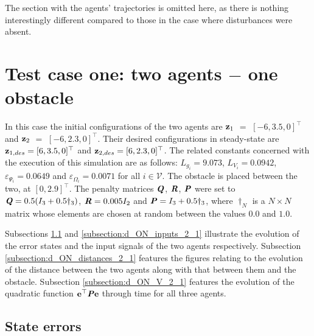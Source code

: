 The section with the agents' trajectories is omitted here, as
there is nothing interestingly different compared to those
in the case where disturbances were absent.

\section{Test case one: two agents $-$ one obstacle}

In this case the initial configurations of the two agents are
$\bm{\mathbf{z}}_1$ $=$ $[-6, 3.5, 0]^{\top}$ and
$\bm{\mathbf{z}}_2$ $=$ $[-6, 2.3, 0]^{\top}$.
Their desired configurations in steady-state are
$\bm{\mathbf{z}}_{1,des} = [6, 3.5, 0]^{\top}$ and
$\bm{\mathbf{z}}_{2,des} = [6, 2.3, 0]^{\top}$.
The related constants concerned with the execution
of this simulation are as follows: $L_{g_i} = 9.073$, $L_{V_i} = 0.0942$,
$\varepsilon_{\Psi_i} = 0.0649$ and $\varepsilon_{\Omega_i} = 0.0071$ for
all $i \in \mathcal{V}$.
The obstacle is placed between the two, at $[0, 2.9]^{\top}$. The penalty
matrices $\bm{\mathit{Q}}$, $\bm{\mathit{R}}$, $\bm{\mathit{P}}$ were set to
$\bm{\mathit{Q}} = 0.5 (I_3 + 0.5 \dagger_3)$, $\bm{\mathit{R}} = 0.005 I_2$ and
$\bm{\mathit{P}} = I_3 + 0.5 \dagger_3$, where $\dagger_N$ is a $N \times N$ matrix whose
elements are chosen at random between the values $0.0$ and $1.0$.

Subsections \ref{subsection:d_ON_errors_2_1} and \ref{subsection:d_ON_inputs_2_1}
illustrate the evolution of the error states and the input signals of the two agents
respectively. Subsection \ref{subsection:d_ON_distances_2_1} features the
figures relating to the evolution of the distance between the two agents
along with that between them and the obstacle. Subsection
\ref{subsection:d_ON_V_2_1} features the evolution of the quadratic function
$\bm{\mathbf{e}}^{\top} \bm{\mathit{P}} \bm{\mathbf{e}}$ through time for all three agents.

\subsection{State errors}
\label{subsection:d_ON_errors_2_1}

\noindent{}


